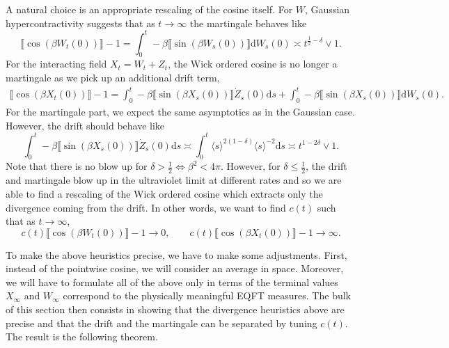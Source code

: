 \documentclass[11pt, a4paper]{scrartcl}
\numberwithin{equation}{section}
\theoremstyle{plain}
\theoremstyle{remark}
\newcommand{\mathd}{\mathrm{d}}
\begin{document}
A natural choice is an appropriate rescaling of the cosine itself.
For $W$, Gaussian hypercontractivity suggests that as $t\to\infty$ the martingale behaves like
\[
	\llbracket \cos(\beta W_t(0))\rrbracket-1 =
	\int_{0}^{t} -\beta\llbracket \sin(\beta W_s(0))\rrbracket\mathd W_s(0) \asymp t^{\frac{1}{2}-\delta}\vee1.
\]
For the interacting field $X_t=W_t+Z_t$, the Wick ordered cosine is no longer a martingale as we pick up
an additional drift term,
\[\begin{aligned}
		\llbracket \cos(\beta X_t(0))\rrbracket-1
		= \int_{0}^{t} -\beta\llbracket \sin(\beta X_s(0))\rrbracket\dot{Z}_s(0)\mathd s
		+ \int_{0}^{t} -\beta\llbracket \sin(\beta X_s(0))\rrbracket\mathd W_s(0).
	\end{aligned}
\]
For the martingale part, we expect the same asymptotics as in the Gaussian case.
However, the drift should behave like
\[\int_{0}^{t} -\beta\llbracket \sin(\beta X_s(0))\rrbracket\dot{Z}_s(0)\mathd s
	\asymp \int_{0}^{t} \langle s\rangle^{2(1-\delta)}\langle s \rangle^{-2}\mathd s
	\asymp t^{1-2\delta}\vee 1.\]
Note that there is no blow up for $\delta>\frac{1}{2}\iff\beta^2<4\pi$. However,
for $\delta\leqslant\frac{1}{2}$, the drift and martingale blow up in
the ultraviolet limit at  different rates and so we are able to find a rescaling of the Wick ordered
cosine which extracts only the divergence coming from the drift. In other words, we
want to find $c(t)$ such that as $t\to\infty$,
\[c(t)\llbracket \cos(\beta W_t(0))\rrbracket-1\to 0,\qquad
	c(t)\llbracket \cos(\beta X_t(0))\rrbracket-1\to \infty.\]

To make the above heuristics precise, we have to make some adjustments.
First, instead of the pointwise cosine, we will consider an average in space.
Moreover, we will have to formulate all of the above only in terms of the terminal
values $X_\infty$ and $W_\infty$ correspond to the physically meaningful EQFT measures.
The bulk of this section then consists in showing that the divergence heuristics
above are precise and that the drift and the martingale can be separated by tuning
$c(t)$. The result is the following theorem.
\end{document}
